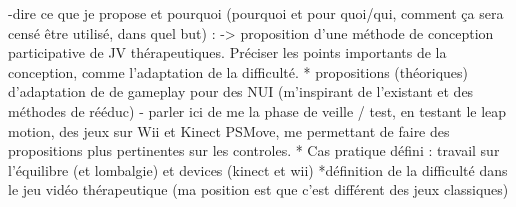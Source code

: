 	-dire ce que je propose et pourquoi (pourquoi et pour quoi/qui, comment ça sera censé être utilisé, dans quel but) :
-> proposition d'une méthode de conception participative de JV thérapeutiques. Préciser les points importants de la conception, comme l'adaptation de la difficulté.
* propositions (théoriques) d'adaptation de de gameplay pour des NUI (m'inspirant de l'existant et des méthodes de rééduc)
	- parler ici de me la phase de veille / test, en testant le leap motion, des jeux sur Wii et Kinect PSMove, me permettant de faire des propositions plus pertinentes sur les controles.
* Cas pratique défini : travail sur l'équilibre (et lombalgie) et devices (kinect et wii)
*définition de la difficulté dans le jeu vidéo thérapeutique (ma position est que c'est différent des jeux classiques)